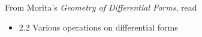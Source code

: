 \documentclass{homework}
\author{Jim Fowler}
\date{Week 5: Forms on manifolds}
\begin{document}
\maketitle

From Morita's \textit{Geometry of Differential Forms}, read
\begin{itemize}
\item 2.2 Various operations on differential forms
\end{itemize}
\end{document}
